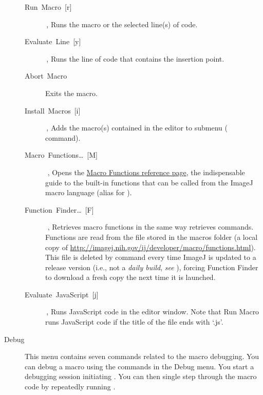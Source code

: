 \begin{description}
\begin{description}
\item [{\textsf{Run\ Macro\ {[}r{]}}}] \,,
Runs the macro or the selected line(s) of code.
\item [{\textsf{Evaluate\ Line\ {[}y{]}}}] \,,
Runs the line of code that contains the insertion point.
\item [{\textsf{Abort\ Macro}}] Exits the macro.
\item [{\textsf{Install\ Macros\ {[}i{]}}}] \,,
Adds the macro(s) contained in the editor to \textsf{}
submenu (\textsf{}
command).
\item [{\textsf{Macro\ Functions\ldots{}\ {[}M{]}}}] \,\,,
Opens the \href{http://imagej.nih.gov/ij/developer/macro/functions.html}{Macro Functions reference page},
the indispensable guide to the built-in functions that can be called
from the ImageJ macro language (alias for \textsf{).}
\item [{\textsf{\label{FunctionFinder[F]}Function\ Finder\ldots{}\ {[}F{]}}}] \,\,,
\cite{C-FxFinder} Retrieves macro functions
in the same way  retrieves commands.
Functions are read from the  file stored
in the macros folder (a local copy of \url{http://imagej.nih.gov/ij/developer/macro/functions.html}).
This file is deleted by \textsf{}
command every time ImageJ is updated to a release version (i.e., not
a \emph{daily build}, \emph{see} ),
forcing Function Finder to download a fresh copy the next time it
is launched.
\item [{\textsf{\label{misc:EvaluateJavaScript}Evaluate\ JavaScript\ {[}j{]}}}] \,,
Runs JavaScript code in the editor window. Note that \textsf{Run Macro
}runs JavaScript code if the title of the file ends with `.js'.
\end{description}
\item [{\textsf{Debug}\emph{\lyxarrow{}}}] This menu contains seven commands
related to the macro debugging. You can debug a macro
using the commands in the \textsf{Debug} menu. You start a debugging
session initiating \textsf{}. You can
then single step through the macro code by repeatedly running \textsf{}. 


\end{description}
